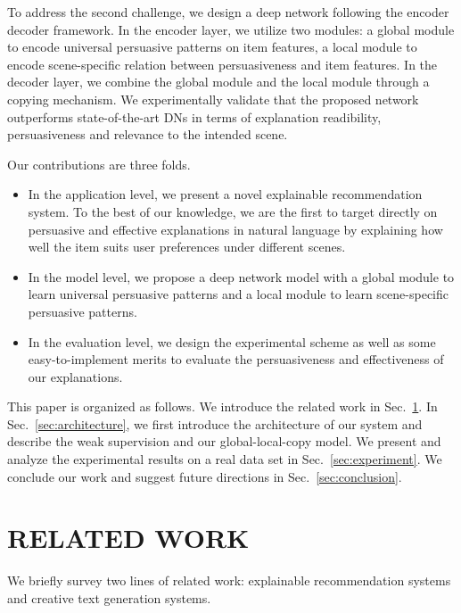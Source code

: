 \documentclass[sigconf]{acmart}
\begin{document}
To address the second challenge, we design a deep network following the encoder decoder framework. In the encoder layer, we utilize two modules: a global module to encode universal persuasive patterns on item features, a local module to encode scene-specific relation between persuasiveness and item features. In the decoder layer, we combine the global module and the local module through a copying mechanism. We experimentally validate that the proposed network outperforms state-of-the-art DNs in terms of explanation readibility, persuasiveness and relevance to the intended scene. 

Our contributions are three folds.
\begin{itemize}
\item In the application level, we present a novel explainable recommendation system. To the best of our knowledge, we are the first to target directly on persuasive and effective explanations in natural language by explaining how well the item suits user preferences under different scenes.
\item In the model level, we propose a deep network model with a global module to learn universal persuasive patterns and a local module to learn scene-specific persuasive patterns.
\item In the evaluation level, we design the experimental scheme as well as some easy-to-implement merits to evaluate the persuasiveness and effectiveness of our explanations. 
\end{itemize}


This paper is organized as follows. We introduce the related work in Sec.~\ref{sec:related}. In Sec.~\ref{sec:architecture}, we first introduce the architecture of our system and describe the weak supervision and our global-local-copy model. We present and analyze the experimental results on a real data set in Sec.~\ref{sec:experiment}. We conclude our work and suggest future directions in Sec.~\ref{sec:conclusion}.

\section{RELATED WORK}\label{sec:related}
We briefly survey two lines of related work: explainable recommendation systems and creative text generation systems.
\end{document}
